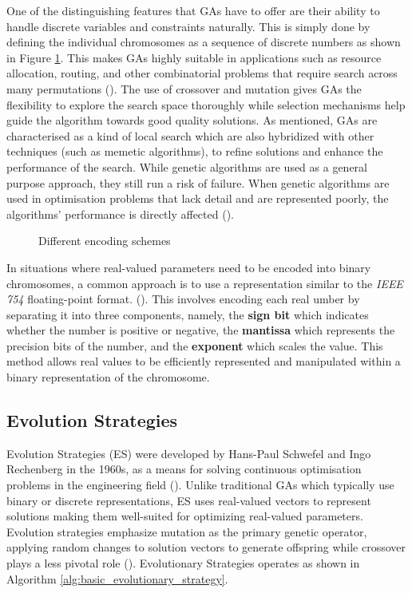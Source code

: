 \parbreak\noindent One of the distinguishing features that GAs have to offer are their ability to handle discrete variables and constraints naturally. This is simply done by defining the individual chromosomes as a sequence of discrete numbers as shown in Figure \ref{fig:encoding}. This makes GAs highly suitable in applications such as resource allocation, routing, and other combinatorial problems that require search across many permutations (\cite{back2012handbook}). The use of crossover and mutation gives GAs the flexibility to explore the search space thoroughly while selection mechanisms help guide the algorithm towards good quality solutions. As mentioned, GAs are characterised as a kind of local search which are also hybridized with other techniques (such as memetic algorithms), to refine solutions and enhance the performance of the search. While genetic algorithms are used as a general purpose approach, they still run a risk of failure. When genetic algorithms are used in optimisation problems that lack detail and are represented poorly, the algorithms' performance is directly affected (\cite{back2012handbook}).

\parbreak
\begin{figure}[H] %
	\centering %
	\caption{Different encoding schemes}
	\label{fig:encoding} %
\end{figure}

\parbreak\noindent In situations where real-valued parameters need to be encoded into binary chromosomes, a common approach is to use a representation similar to the \textit{IEEE 754} floating-point format. (\cite{satman2020machine}). This involves encoding each real umber by separating it into three components, namely, the \textbf{sign bit} which indicates whether the number is positive or negative, the \textbf{mantissa} which represents the precision bits of the number, and the \textbf{exponent} which scales the value. This method allows real values to be efficiently represented and manipulated within a binary representation of the chromosome.

\subsection{Evolution Strategies}
Evolution Strategies (ES) were developed by Hans-Paul Schwefel and Ingo Rechenberg in the 1960s, as a means for solving continuous optimisation problems in the engineering field (\cite{intelligentOptimization}). Unlike traditional GAs which typically use binary or discrete representations, ES uses real-valued vectors to represent solutions making them well-suited for optimizing real-valued parameters. Evolution strategies emphasize mutation as the primary genetic operator, applying random changes to solution vectors to generate offspring while crossover plays a less pivotal role (\cite{back2012handbook}). Evolutionary Strategies operates as shown in Algorithm \ref{alg:basic_evolutionary_strategy}.

